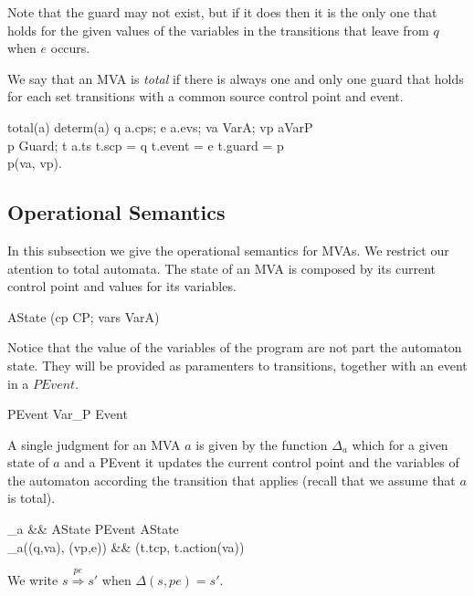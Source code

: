 \documentclass[a4paper,10pt]{article}
\begin{document}
Note that the guard may not exist, but if it does then it is the only one that holds for the given values of
the variables in the transitions that leave from $q$ when $e$ occurs.

We say that an MVA is \emph{total} if there is always one and only one guard that holds for each set
transitions with a common source control point and event.
\begin{haskell}\label{def:MVATotal}
total(a) \eqdef determ(a) \wedge \forall q \in a.cps; e \in a.evs; va \in VarA; vp \in aVarP \cdot\\
 \quad\quad \exists p \in Guard; t \in a.ts \cdot t.scp = q \wedge t.event = e \wedge t.guard = p \wedge\\
 \quad\quad p(va, vp).
\end{haskell}

\subsection{Operational Semantics} 
In this subsection we give the operational semantics for MVAs. We restrict our atention to total automata.
The state of an MVA is composed by its current control point and values for its variables.
\begin{haskell}
AState \eqdef (cp \dcolon CP; vars \dcolon VarA)
\end{haskell}

Notice that the value of the variables of the program are not part the automaton state. They will be provided
as paramenters to transitions, together with an event in a $PEvent$.

\begin{haskell}
PEvent \eqdef Var_P \times Event
\end{haskell}

A single judgment for an MVA $a$ is given by the function $\Delta_a$ which for a given state of $a$ and a
\<PEvent\> it updates the current control point and the variables of the automaton according the transition
that applies (recall that we assume that $a$ is total).
\begin{haskell}
\Delta_a &\ofType& AState \times PEvent \to AState\\
\Delta_a((q,va), (vp,e)) &\eqdef& (t.tcp, t.action(va))
\end{haskell}

We write $s \stackrel{pe}{\Rightarrow} s'$  when $\Delta(s, pe) = s'$.
\end{document}

